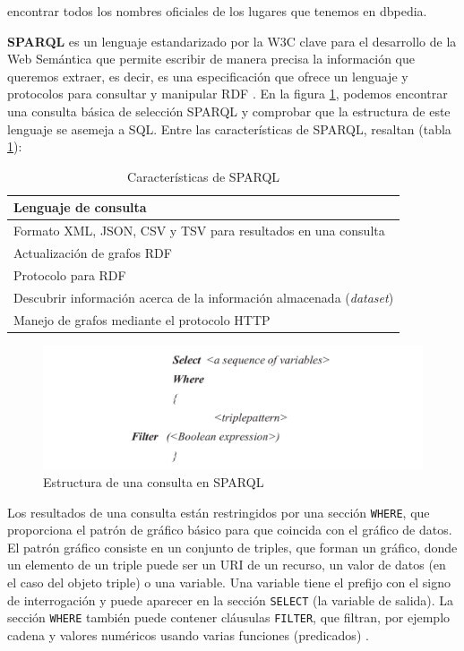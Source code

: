 encontrar todos los nombres oficiales de los lugares que tenemos en dbpedia.

\textbf{SPARQL} es un lenguaje estandarizado por la W3C clave para el desarrollo de la Web Semántica que permite escribir de manera precisa la información que queremos extraer, es decir, es una especificación que ofrece un lenguaje y protocolos para consultar y manipular RDF \cite{tesis-otro}. En la figura \ref{fig:sparql}, podemos encontrar una consulta básica de selección SPARQL y comprobar que la estructura de este lenguaje se asemeja a SQL. Entre las características de SPARQL, resaltan (tabla \ref{carac-sparql}): 

\begin{table}[H]
	\caption{Características de SPARQL}
	\label{carac-sparql}
	\centering
	\begin{tabular}{|l|}
		\hline
		 Lenguaje de consulta \\ \hline
		 Formato XML, JSON, CSV y TSV  para resultados en una consulta \\ \hline
Actualización de grafos RDF	\\ \hline
	Protocolo para RDF	\\ \hline
	Descubrir información acerca de la información  almacenada (\textit{dataset})	\\ \hline
	 Manejo de grafos mediante el protocolo HTTP 	\\ \hline
	\end{tabular}
\end{table}

\begin{figure}[H]
	\centering
	\includegraphics[width=1.1\linewidth]{imagenes/capitulo3/sparql}
	\caption{Estructura de una consulta en SPARQL}
	\label{fig:sparql}
\end{figure}

Los resultados de una consulta están restringidos por una sección \texttt{WHERE}, que proporciona el patrón de gráfico básico para que coincida con el gráfico de datos. El patrón gráfico consiste en un conjunto de triples, que forman un gráfico, donde un elemento de un triple puede ser un URI de un recurso, un valor de datos (en el caso del objeto triple) o una variable. Una variable tiene el prefijo con el signo de interrogación y puede aparecer en la sección \texttt{SELECT} (la variable de salida). La sección \texttt{WHERE} también puede contener cláusulas \texttt{FILTER}, que filtran, por ejemplo cadena y valores numéricos usando varias funciones (predicados) \cite{tesis-otro}.\\

